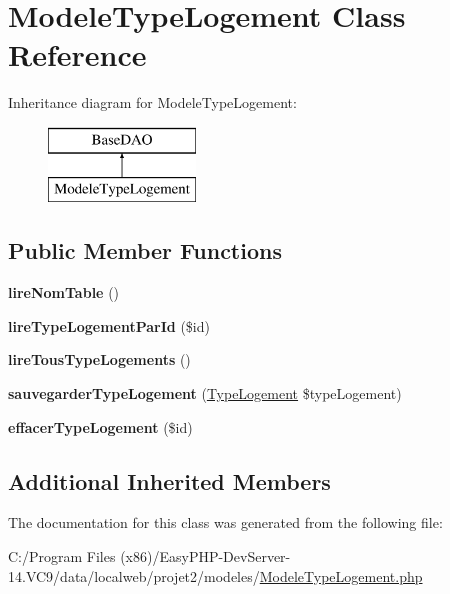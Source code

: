 \hypertarget{class_modele_type_logement}{}\section{Modele\+Type\+Logement Class Reference}
\label{class_modele_type_logement}
Inheritance diagram for Modele\+Type\+Logement\+:\begin{figure}[H]
\begin{center}
\leavevmode
\includegraphics[height=2.000000cm]{class_modele_type_logement}
\end{center}
\end{figure}
\subsection*{Public Member Functions}
\begin{DoxyCompactItemize}
\item 
\mbox{\label{class_modele_type_logement_ada05b2253807bcebf8b0d96d57fcc228}} 
{\bfseries lire\+Nom\+Table} ()
\item 
\mbox{\label{class_modele_type_logement_abbe4f320716645e7a7a90b9ab9f8035d}} 
{\bfseries lire\+Type\+Logement\+Par\+Id} (\$id)
\item 
\mbox{\label{class_modele_type_logement_a613f5fcd1bf83fc98aa98c2d0a8ffddd}} 
{\bfseries lire\+Tous\+Type\+Logements} ()
\item 
\mbox{\label{class_modele_type_logement_a5cfef61ac83c76fe8e62a17204fedf9e}} 
{\bfseries sauvegarder\+Type\+Logement} (\hyperlink{class_type_logement}{Type\+Logement} \$type\+Logement)
\item 
\mbox{\label{class_modele_type_logement_a61ccbfc98ce96ceafa98ebd6fc8f9bad}} 
{\bfseries effacer\+Type\+Logement} (\$id)
\end{DoxyCompactItemize}
\subsection*{Additional Inherited Members}


The documentation for this class was generated from the following file\+:\begin{DoxyCompactItemize}
\item 
C\+:/\+Program Files (x86)/\+Easy\+P\+H\+P-\/\+Dev\+Server-\/14.\+V\+C9/data/localweb/projet2/modeles/\hyperlink{_modele_type_logement_8php}{Modele\+Type\+Logement.\+php}\end{DoxyCompactItemize}
